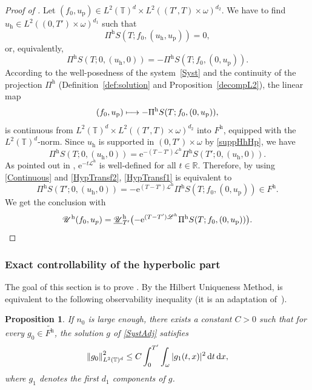 \documentclass[10pt]{amsart}
\let\mathcal\mathscr
\def\mto{\mathchoice{\longmapsto}{\mapsto}{\mapsto}{\mapsto}}
\theoremstyle{plain}
\newtheorem{prop}[theorem]{Proposition}
\theoremstyle{definition}
\theoremstyle{remark}
\newcommand{\norme}[1]{\left\lVert#1\right\rVert}
\newcommand{\diff}[1][-3]{\ensuremath{\mathop{}\mkern#1mu\mathrm{d}}}
\newcommand{\set}{\mathbb}
\newcommand{\R}{} %
\renewcommand{\R}{\set{R}}
\newcommand{\T}{\set{T}}
\newcommand{\h}{{\mathrm h}}
\newcommand{\p}{{\mathrm p}}
\newcommand{\eu}{\mathrm e}
\let\originalleft\left
\let\originalright\right
\renewcommand{\left}{\mathopen{}\mathclose\bgroup\originalleft}
\renewcommand{\right}{\aftergroup\egroup\originalright}
\begin{document}
\begin{proof}[Proof of ]
Let $(f_0,u_{\p})\in L^2(\T)^{d} \times L^2((T',T)\times\omega)^{d_2} $. We have to find $u_{\h} \in L^2((0,T')\times\omega)^{d_1}$ such that
\[
\Pi^{\h} S(T;f_0, (u_{\h},u_{\p})) = 0,
\]
or, equivalently,
\begin{equation}
\label{HypTransf1}
\Pi^{\h} S(T;0, (u_{\h},0))= -\Pi^{\h} S(T;f_0, (0,u_{\p})).
\end{equation}
According to the well-posedness of the system~\eqref{Syst} and the continuity of the projection $\Pi^\h$ (Definition~\ref{def:solution} and Proposition~\ref{decompL2}), the linear map
\begin{equation}
\label{Continuous}
(f_0, u_{\p}) \mto -\Pi^{\h} S(T;f_0, (0,u_{\p})),
\end{equation}
is continuous from $L^2(\T)^{d} \times L^2((T',T)\times\omega)^{d_2}$ into $F^{\h}$, equipped with the $L^2(\T)^d$-norm. Since $u_{\h}$ is supported in $(0,T')\times\omega$ by \eqref{suppHhHp}, we have
\begin{equation}
\label{HypTransf2}
\Pi^{\h} S(T;0, (u_{\h},0))= \eu^{-(T-T')\mathcal{L}^{\h}}\Pi^{\h} S(T';0, (u_{\h},0)).
\end{equation}
As pointed out in , $\eu^{-t\mathcal{L}^{\h}}$ is well-defined for all $t \in \R$. Therefore, by using \eqref{Continuous} and \eqref{HypTransf2}, \eqref{HypTransf1} is equivalent to
\begin{equation}
\label{HypTransf3}
\Pi^{\h} S(T';0, (u_{\h},0))= -\eu^{(T-T')\mathcal{L}^{\h}}\Pi^{\h} S(T;f_0, (0,u_{\p})) \in F^{\h}.
\end{equation}
We get the conclusion with
\[
\mathcal{U}^\h(f_0,u_p) = \underline{\mathcal{U}}_{T'}^{\h} \bigl(-\eu^{(T-T')\mathcal{L}^{h}}\Pi^{\h} S(T;f_0, (0,u_{\p})) \bigr).\qedhere
\]
\end{proof}

\subsubsection{Exact controllability of the hyperbolic part} \label{subsec:Hyp_NC}

The goal of this section is to prove .
By the Hilbert Uniqueness Method,  is equivalent to the following observability inequality (it is an adaptation of~\cite[Th.\,2.42]{coron_2007}).
\begin{prop}
\label{ObsHyp}
If $n_0$ is large enough, there exists a constant $C>0$ such that for every $g_0 \in \widetilde{F^{\h}}$, the solution $g$ of \eqref{SystAdj} satisfies
\begin{equation}
\label{inobsHyp}
\norme{g_0}_{L^2(\T)^{d}}^{2} \leq C \int_{0}^{T'} \int_{\omega} |g_{1}(t,x)|^{2} \diff t \diff x,
\end{equation}
where $g_{1}$ denotes the first $d_1$ components of $g$.
\end{prop}
\end{document}

